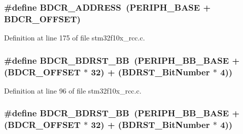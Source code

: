 \subsubsection[{\texorpdfstring{B\+D\+C\+R\+\_\+\+A\+D\+D\+R\+E\+SS}{BDCR_ADDRESS}}]{\setlength{\rightskip}{0pt plus 5cm}\#define B\+D\+C\+R\+\_\+\+A\+D\+D\+R\+E\+SS~({\bf P\+E\+R\+I\+P\+H\+\_\+\+B\+A\+SE} + {\bf B\+D\+C\+R\+\_\+\+O\+F\+F\+S\+ET})}\hypertarget{group___r_c_c___private___defines_ga40b5a415d697b6af7babd8a208c92435}{}\label{group___r_c_c___private___defines_ga40b5a415d697b6af7babd8a208c92435}


Definition at line 175 of file stm32f10x\+\_\+rcc.\+c.

\subsubsection[{\texorpdfstring{B\+D\+C\+R\+\_\+\+B\+D\+R\+S\+T\+\_\+\+BB}{BDCR_BDRST_BB}}]{\setlength{\rightskip}{0pt plus 5cm}\#define B\+D\+C\+R\+\_\+\+B\+D\+R\+S\+T\+\_\+\+BB~({\bf P\+E\+R\+I\+P\+H\+\_\+\+B\+B\+\_\+\+B\+A\+SE} + ({\bf B\+D\+C\+R\+\_\+\+O\+F\+F\+S\+ET} $\ast$ 32) + ({\bf B\+D\+R\+S\+T\+\_\+\+Bit\+Number} $\ast$ 4))}\hypertarget{group___r_c_c___private___defines_ga892fdf297b85b85cbaf0723649b31818}{}\label{group___r_c_c___private___defines_ga892fdf297b85b85cbaf0723649b31818}


Definition at line 96 of file stm32f10x\+\_\+rcc.\+c.

\subsubsection[{\texorpdfstring{B\+D\+C\+R\+\_\+\+B\+D\+R\+S\+T\+\_\+\+BB}{BDCR_BDRST_BB}}]{\setlength{\rightskip}{0pt plus 5cm}\#define B\+D\+C\+R\+\_\+\+B\+D\+R\+S\+T\+\_\+\+BB~({\bf P\+E\+R\+I\+P\+H\+\_\+\+B\+B\+\_\+\+B\+A\+SE} + ({\bf B\+D\+C\+R\+\_\+\+O\+F\+F\+S\+ET} $\ast$ 32) + ({\bf B\+D\+R\+S\+T\+\_\+\+Bit\+Number} $\ast$ 4))}\hypertarget{group___r_c_c___private___defines_ga892fdf297b85b85cbaf0723649b31818}{}\label{group___r_c_c___private___defines_ga892fdf297b85b85cbaf0723649b31818}


